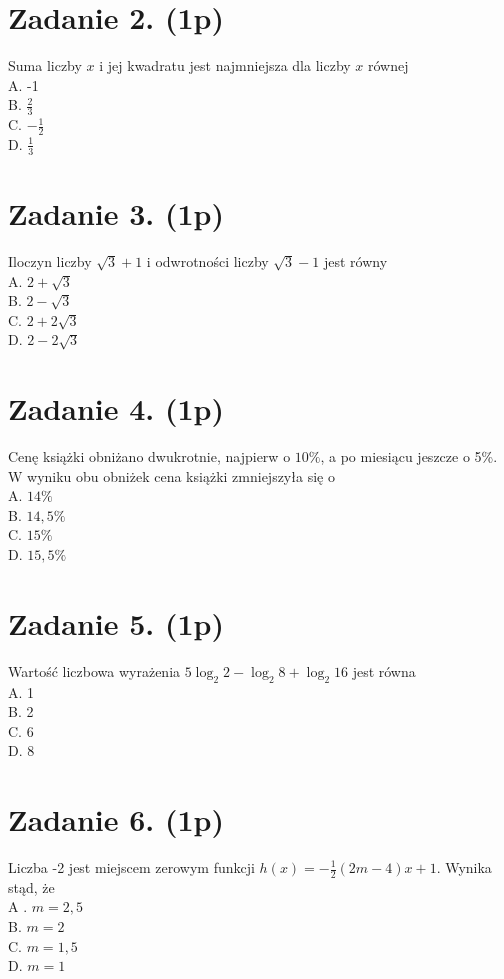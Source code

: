 \documentclass[10pt]{article}
\begin{document}
\section*{Zadanie 2. (1p)}
Suma liczby \(x\) i jej kwadratu jest najmniejsza dla liczby \(x\) równej\\
A. -1\\
B. \(\frac{2}{3}\)\\
C. \(-\frac{1}{2}\)\\
D. \(\frac{1}{3}\)

\section*{Zadanie 3. (1p)}
Iloczyn liczby \(\sqrt{3}+1\) i odwrotności liczby \(\sqrt{3}-1\) jest równy\\
A. \(2+\sqrt{3}\)\\
B. \(2-\sqrt{3}\)\\
C. \(2+2 \sqrt{3}\)\\
D. \(2-2 \sqrt{3}\)

\section*{Zadanie 4. (1p)}
Cenę książki obniżano dwukrotnie, najpierw o \(10 \%\), a po miesiącu jeszcze o 5\%. W wyniku obu obniżek cena książki zmniejszyła się o\\
A. \(14 \%\)\\
B. \(14,5 \%\)\\
C. \(15 \%\)\\
D. \(15,5 \%\)

\section*{Zadanie 5. (1p)}
Wartość liczbowa wyrażenia \(5 \log _{2} 2-\log _{2} 8+\log _{2} 16\) jest równa\\
A. 1\\
B. 2\\
C. 6\\
D. 8

\section*{Zadanie 6. (1p)}
Liczba -2 jest miejscem zerowym funkcji \(h(x)=-\frac{1}{2}(2 m-4) x+1\). Wynika stąd, że\\
A . \(m=2,5\)\\
B. \(m=2\)\\
C. \(m=1,5\)\\
D. \(m=1\)
\end{document}
